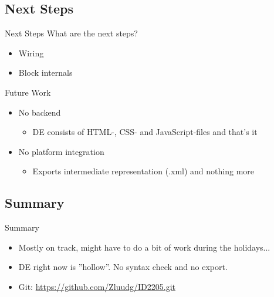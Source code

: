 \documentclass{beamer}
\begin{document}
\subsection{Next Steps}
\begin{frame}{Next Steps}
	What are the next steps?
	\begin{itemize}
		\item Wiring
		\item Block internals
	\end{itemize}
\end{frame}

\begin{frame}{Future Work}
	\begin{itemize}
		\item No backend
		\begin{itemize}
			\item DE consists of HTML-, CSS- and JavaScript-files and that's it
		\end{itemize}
		\item No platform integration
		\begin{itemize}
			\item Exports intermediate representation (.xml) and nothing more
		\end{itemize}
	\end{itemize}
\end{frame}

\subsection*{Summary}
\begin{frame}{Summary}
\begin{itemize}
	\item Mostly on track, might have to do a bit of work during the holidays...
	\item DE right now is ''hollow''. No syntax check and no export.
	\item Git: \url{https://github.com/Zluudg/ID2205.git}
\end{itemize}
\end{frame}
\end{document}
